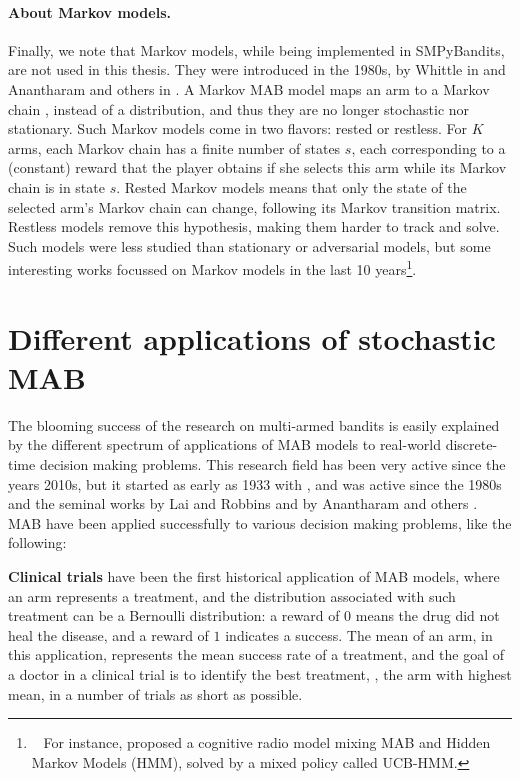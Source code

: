 \paragraph{About Markov models.}
%
Finally, we note that Markov models, while being implemented in SMPyBandits, are not used in this thesis.
They were introduced in the 1980s, by Whittle in \cite{Whittle1988} and Anantharam and others in \cite{Anantharam87b}.
A Markov MAB model maps an arm to a Markov chain \cite{Norris98}, instead of a distribution, and thus they are no longer stochastic nor stationary.
Such Markov models come in two flavors: rested or restless.
For $K$ arms, each Markov chain has a finite number of states $s$, each corresponding to a (constant) reward that the player obtains if she selects this arm while its Markov chain is in state $s$.
Rested Markov models means that only the state of the selected arm's Markov chain can change, following its Markov transition matrix.
Restless models remove this hypothesis, making them harder to track and solve.
%
Such models were less studied than stationary or adversarial models, but some interesting works focussed on Markov models in the last 10 years\footnote{~
For instance, \cite{Melian15} proposed a cognitive radio model mixing MAB and Hidden Markov Models (HMM), solved by a mixed policy called UCB-HMM.}.


\section{Different applications of stochastic MAB}
\label{sec:2:applicationsofStochasticMAB}

The blooming success of the research on multi-armed bandits is easily explained by the different spectrum of applications of MAB models to real-world discrete-time decision making problems.
This research field has been very active since the years 2010s, but it started as early as 1933 with \cite{Thompson33}, and was active since the 1980s and the seminal works by Lai and Robbins \cite{LaiRobbins85} and by Anantharam and others \cite{Anantharam87a}.
%
MAB have been applied successfully to various decision making problems, like the following:

\textbf{Clinical trials} have been the first historical application of MAB models, where an arm represents a treatment, and the distribution associated with such treatment can be a Bernoulli distribution: a reward of $0$ means the drug did not heal the disease, and a reward of $1$ indicates a success. The mean of an arm, in this application, represents the mean success rate of a treatment, and the goal of a doctor in a clinical trial is to identify the best treatment, \ie, the arm with highest mean, in a number of trials as short as possible.
%


